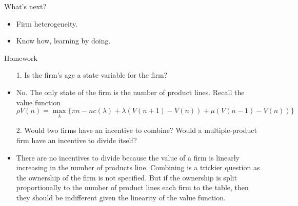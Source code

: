 \documentclass[usenames,dvipsnames,aspectratio=169]{beamer}
\begin{document}
\begin{frame}{What's next?}
    \begin{itemize}
        \item Firm heterogeneity. 
        \item Know how, learning by doing. 
    \end{itemize}
\end{frame}

\begin{frame}[allowframebreaks]{Homework}
    \begin{itemize}
    \vspace{15pt}
        \item[1.] Is the firm's age a state variable for the firm? \\ 
        \item No. The only state of the firm is the number of product lines. Recall the value function
        \begin{equation*}
            \rho V(n) = \max_{\lambda}\Big\{ \pi n - nc(\lambda) + \lambda\left(V(n+1)-V(n)\right) + \mu\left( V(n-1)-V(n)\right)\Big\}
        \end{equation*}
        \vfill
        \item[2.] Would two firms have an incentive to combine?  Would a multiple-product firm have an incentive to divide itself? 
        \item There are no incentives to divide because the value of a firm is linearly increasing in the number of products line. Combining is a trickier question as the ownership of the firm is not specified. But if the ownership is split proportionally to the number of product lines each firm to the table, then they should be indifferent given the linearity of the value function. 
        \vspace{15pt}
        \framebreak
        

\end{itemize}
\end{frame}
\end{document}
